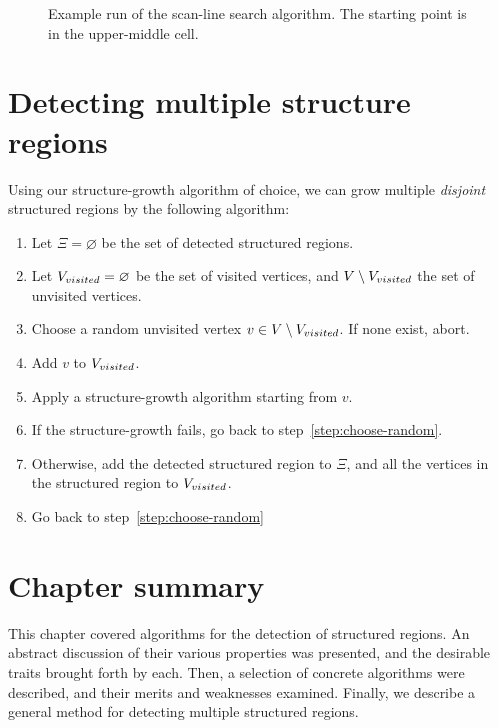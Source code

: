 \begin{figure}[H]
\drawmatrix[cell wd=0.6, cell ht=0.6]{\stairsearchmatrix}
\caption{Example run of the scan-line search algorithm. The starting point is in the upper-middle cell.}
\end{figure}


\section{Detecting multiple structure regions}
Using our structure-growth algorithm of choice, we can grow multiple \emph{disjoint} structured regions by the following algorithm:
\begin{enumerate}
\item Let $\Xi = \varnothing$ be the set of detected structured regions.
\item Let $V_{visited} = \varnothing$ be the set of visited vertices, and $V \setminus V_{visited}$ the set of unvisited vertices.
\item \label{step:choose-random} Choose a random unvisited vertex $v \in V \setminus V_{visited}$. If none exist, abort.
\item Add $v$ to $V_{visited}$.
\item Apply a structure-growth algorithm starting from $v$.
\item If the structure-growth fails, go back to step~\ref{step:choose-random}.
\item Otherwise, add the detected structured region to $\Xi$, and all the vertices in the structured region to $V_{visited}$.
\item Go back to step~\ref{step:choose-random}
\end{enumerate}


\section{Chapter summary}
This chapter covered algorithms for the detection of structured regions. An abstract discussion of their various properties was presented, and the desirable traits brought forth by each. Then, a selection of concrete algorithms were described, and their merits and weaknesses examined. Finally, we describe a general method for detecting multiple structured regions.